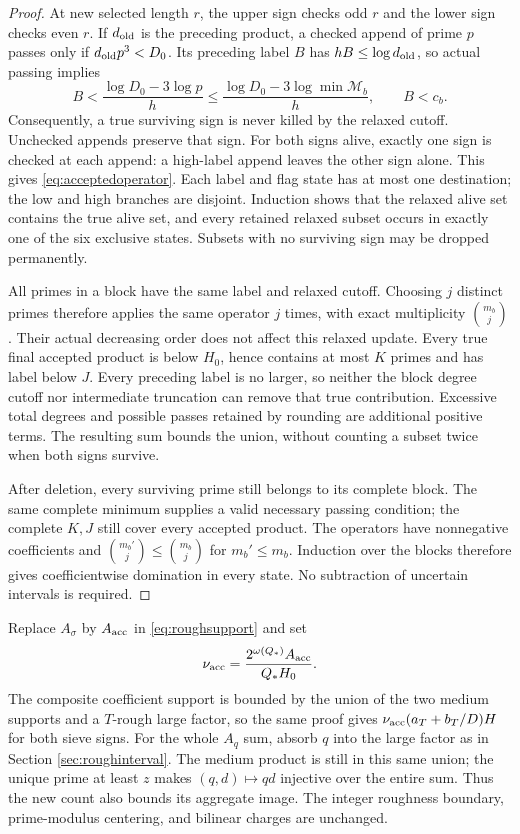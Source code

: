 \documentclass[11pt]{article}
\begin{document}
\begin{proof}
At new selected length $r$, the upper sign checks odd $r$ and the lower
sign checks even $r$. If $d_{\rm old}$ is the preceding product, a checked
append of prime $p$ passes only if $d_{\rm old}p^3<D_0$.
Its preceding label $B$ has $hB\le\log d_{\rm old}$, so actual passing
implies
\[
B<\frac{\log D_0-3\log p}{h}
 \le\frac{\log D_0-3\log\min\mathcal M_b}{h},\qquad B<c_b.
\]
Consequently, a true surviving sign is never killed by the relaxed
cutoff. Unchecked appends preserve that sign. For both signs alive,
exactly one sign is checked at each append: a high-label append leaves
the other sign alone. This gives \eqref{eq:acceptedoperator}.
Each label and flag state has at most one destination; the low and high
branches are disjoint. Induction shows that the relaxed alive set
contains the true alive set, and every retained relaxed subset occurs
in exactly one of the six exclusive states. Subsets with no surviving sign may
be dropped permanently.

All primes in a block have the same label and relaxed cutoff. Choosing
$j$ distinct primes therefore applies the same operator $j$ times, with
exact multiplicity $\binom{m_b}{j}$. Their actual decreasing order does
not affect this relaxed update. Every true final accepted product is
below $H_0$, hence contains at most $K$ primes and has label below $J$.
Every preceding label is no larger, so neither the block degree cutoff
nor intermediate truncation can remove that true contribution.
Excessive total degrees and possible passes retained by rounding are
additional positive terms. The resulting sum bounds the union, without
counting a subset twice when both signs survive.

After deletion, every surviving prime still belongs to its complete
block. The same complete minimum supplies a valid necessary passing
condition; the complete $K,J$ still cover every accepted product.
The operators have nonnegative coefficients and
$\binom{m_b'}{j}\le\binom{m_b}{j}$ for $m_b'\le m_b$.
Induction over the blocks therefore gives coefficientwise domination
in every state. No subtraction of uncertain intervals is required.
\end{proof}

Replace $A_\sigma$ by $A_{\rm acc}$ in \eqref{eq:roughsupport} and set
\begin{equation}\label{eq:acceptedfraction}
\nu_{\rm acc}=\frac{2^{\omega(Q_*)}A_{\rm acc}}{Q_*H_0}.
\end{equation}
The composite coefficient support is bounded by the union of the two
medium supports and a $T$-rough large factor, so the same proof gives
$\nu_{\rm acc}(a_T+b_T/D)H$ for both sieve signs.
For the whole $A_q$ sum, absorb $q$ into the large factor as in Section
\ref{sec:roughinterval}. The medium product is still in this same union;
the unique prime at least $z$ makes $(q,d)\mapsto qd$ injective over
the entire sum. Thus the new count also bounds its aggregate image.
The integer roughness boundary, prime-modulus centering, and bilinear
charges are unchanged.
\end{document}
